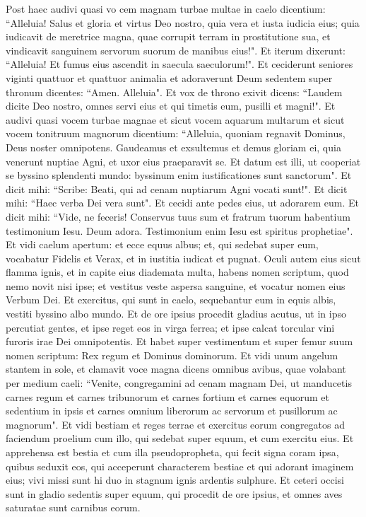 \begin{biblechapter}  
\verse Post haec audivi quasi vo cem magnam turbae multae in caelo dicentium: “Alleluia! Salus et gloria et virtus Deo nostro, 
\verse quia vera et iusta iudicia eius; quia iudicavit de meretrice magna, quae corrupit terram in prostitutione sua, et vindicavit sanguinem servorum suorum de manibus eius!". 
\verse Et iterum dixerunt: “Alleluia! Et fumus eius ascendit in saecula saeculorum!". 
\verse Et ceciderunt seniores viginti quattuor et quattuor animalia et adoraverunt Deum sedentem super thronum dicentes: “Amen. Alleluia". 
\verse Et vox de throno exivit dicens: “Laudem dicite Deo nostro, omnes servi eius et qui timetis eum, pusilli et magni!". 
\verse Et audivi quasi vocem turbae magnae et sicut vocem aquarum multarum et sicut vocem tonitruum magnorum dicentium: “Alleluia, quoniam regnavit Dominus, Deus noster omnipotens. 
\verse Gaudeamus et exsultemus et demus gloriam ei, quia venerunt nuptiae Agni, et uxor eius praeparavit se. 
\verse Et datum est illi, ut cooperiat se byssino splendenti mundo: byssinum enim iustificationes sunt sanctorum". 
\verse Et dicit mihi: “Scribe: Beati, qui ad cenam nuptiarum Agni vocati sunt!". Et dicit mihi: “Haec verba Dei vera sunt". 
\verse Et cecidi ante pedes eius, ut adorarem eum. Et dicit mihi: “Vide, ne feceris! Conservus tuus sum et fratrum tuorum habentium testimonium Iesu. Deum adora. Testimonium enim Iesu est spiritus prophetiae". 
\verse Et vidi caelum apertum: et ecce equus albus; et, qui sedebat super eum, vocabatur Fidelis et Verax, et in iustitia iudicat et pugnat. 
\verse Oculi autem eius sicut flamma ignis, et in capite eius diademata multa, habens nomen scriptum, quod nemo novit nisi ipse; 
\verse et vestitus veste aspersa sanguine, et vocatur nomen eius Verbum Dei. 
\verse Et exercitus, qui sunt in caelo, sequebantur eum in equis albis, vestiti byssino albo mundo.  
\verse Et de ore ipsius procedit gladius acutus, ut in ipso percutiat gentes, et ipse reget eos in virga ferrea; et ipse calcat torcular vini furoris irae Dei omnipotentis. 
\verse Et habet super vestimentum et super femur suum nomen scriptum: Rex regum et Dominus dominorum. 
\verse Et vidi unum angelum stantem in sole, et clamavit voce magna dicens omnibus avibus, quae volabant per medium caeli: “Venite, congregamini ad cenam magnam Dei, 
\verse ut manducetis carnes regum et carnes tribunorum et carnes fortium et carnes equorum et sedentium in ipsis et carnes omnium liberorum ac servorum et pusillorum ac magnorum". 
\verse Et vidi bestiam et reges terrae et exercitus eorum congregatos ad faciendum proelium cum illo, qui sedebat super equum, et cum exercitu eius. 
\verse Et apprehensa est bestia et cum illa pseudopropheta, qui fecit signa coram ipsa, quibus seduxit eos, qui acceperunt characterem bestiae et qui adorant imaginem eius; vivi missi sunt hi duo in stagnum ignis ardentis sulphure. 
\verse Et ceteri occisi sunt in gladio sedentis super equum, qui procedit de ore ipsius, et omnes aves saturatae sunt carnibus eorum. 
\end{biblechapter}

